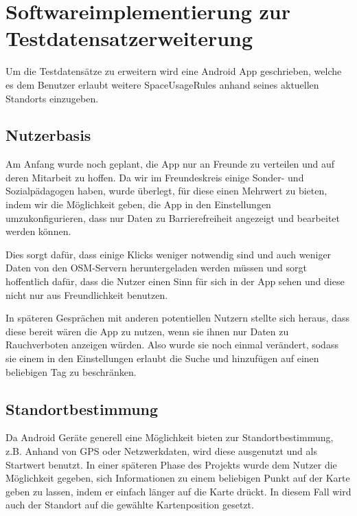 \section[Softwareimplementierung zur Testdatensatzerweiterung]{Softwareimplementierung zur Testdatensatzerweiterung\protect\footnotemark}
\label{sec:HelferApp}
Um die Testdatensätze zu erweitern wird eine Android App geschrieben, welche es dem
Benutzer erlaubt weitere SpaceUsageRules anhand seines aktuellen Standorts einzugeben.

\subsection{Nutzerbasis}
Am Anfang wurde noch geplant, die App nur an Freunde zu verteilen und auf deren Mitarbeit zu hoffen.
Da wir im Freundeskreis einige Sonder- und Sozialpädagogen haben, wurde überlegt, für diese einen Mehrwert zu bieten,
indem wir die Möglichkeit geben, die App in den Einstellungen umzukonfigurieren, dass nur Daten zu Barrierefreiheit
angezeigt und bearbeitet werden können.

Dies sorgt dafür, dass einige Klicks weniger notwendig sind und auch weniger Daten von den OSM-Servern heruntergeladen werden müssen
und sorgt hoffentlich dafür, dass die Nutzer einen Sinn für sich in der App sehen und diese nicht nur aus Freundlichkeit benutzen.

In späteren Gesprächen mit anderen potentiellen Nutzern stellte sich heraus, dass diese bereit wären die App zu nutzen,
wenn sie ihnen nur Daten zu Rauchverboten anzeigen würden.
Also wurde sie noch einmal verändert, sodass sie einem in den Einstellungen erlaubt die Suche und hinzufügen auf einen beliebigen Tag zu beschränken.

\subsection{Standortbestimmung}
Da Android Geräte generell eine Möglichkeit bieten zur Standortbestimmung, z.B. Anhand von GPS oder Netzwerkdaten,
wird diese ausgenutzt und als Startwert benutzt.
In einer späteren Phase des Projekts wurde dem Nutzer die Möglichkeit gegeben, sich Informationen zu einem beliebigen Punkt auf der Karte geben zu lassen,
indem er einfach länger auf die Karte drückt. In diesem Fall wird auch der Standort auf die gewählte Kartenposition gesetzt.

